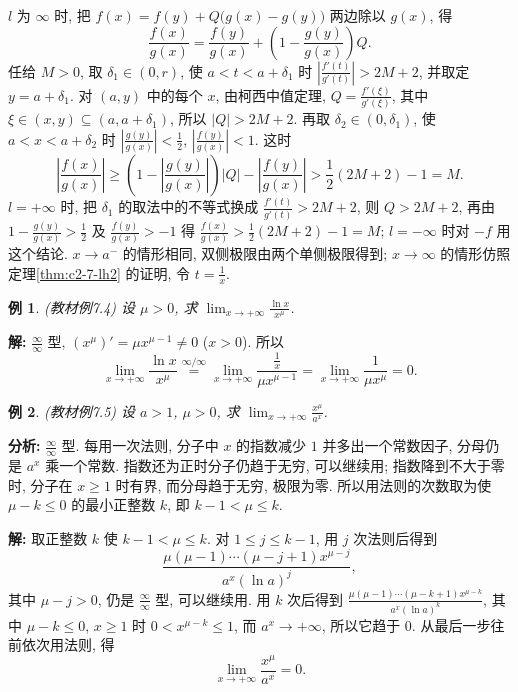 \documentclass[UTF8,openany]{ctexbook}
\theoremstyle{chinesetextbook}
\newtheorem{example}{例}[section]
\newenvironment{cnsolution}{\par\indent\textbf{解:} \ignorespaces}{\par}
\begin{document}
$l$ 为 $\infty$ 时, 把 $f(x)=f(y)+Q\bigl(g(x)-g(y)\bigr)$ 两边除以 $g(x)$, 得
\[
\frac{f(x)}{g(x)}=\frac{f(y)}{g(x)}+\left(1-\frac{g(y)}{g(x)}\right)Q.
\]
任给 $M>0$, 取 $\delta_1\in(0,r)$, 使 $a<t<a+\delta_1$ 时 $\displaystyle\left|\frac{f'(t)}{g'(t)}\right|>2M+2$, 并取定 $y=a+\delta_1$. 对 $(a,y)$ 中的每个 $x$, 由柯西中值定理, $\displaystyle Q=\frac{f'(\xi)}{g'(\xi)}$, 其中 $\xi\in(x,y)\subseteq(a,a+\delta_1)$, 所以 $|Q|>2M+2$. 再取 $\delta_2\in(0,\delta_1)$, 使 $a<x<a+\delta_2$ 时 $\displaystyle\left|\frac{g(y)}{g(x)}\right|<\frac12$, $\displaystyle\left|\frac{f(y)}{g(x)}\right|<1$. 这时
\[
\left|\frac{f(x)}{g(x)}\right|\ge\left(1-\left|\frac{g(y)}{g(x)}\right|\right)|Q|-\left|\frac{f(y)}{g(x)}\right|>\frac12(2M+2)-1=M.
\]
$l=+\infty$ 时, 把 $\delta_1$ 的取法中的不等式换成 $\displaystyle\frac{f'(t)}{g'(t)}>2M+2$, 则 $Q>2M+2$, 再由 $\displaystyle1-\frac{g(y)}{g(x)}>\frac12$ 及 $\displaystyle\frac{f(y)}{g(x)}>-1$ 得 $\displaystyle\frac{f(x)}{g(x)}>\frac12(2M+2)-1=M$; $l=-\infty$ 时对 $-f$ 用这个结论. $x\to a^-$ 的情形相同, 双侧极限由两个单侧极限得到; $x\to\infty$ 的情形仿照定理\ref{thm:c2-7-lh2} 的证明, 令 $\displaystyle t=\frac1x$.
\begin{example}\label{ex:c2-7-4}
\textnormal{(教材例7.4)} 设 $\mu>0$, 求 $\displaystyle\lim_{x\to+\infty}\frac{\ln x}{x^\mu}$.
\end{example}
\begin{cnsolution}
$\displaystyle\frac\infty\infty$ 型, $(x^\mu)'=\mu x^{\mu-1}\ne0$ ($x>0$). 所以
\[
\lim_{x\to+\infty}\frac{\ln x}{x^\mu}\overset{\infty/\infty}{=}\lim_{x\to+\infty}\frac{\frac1x}{\mu x^{\mu-1}}=\lim_{x\to+\infty}\frac1{\mu x^\mu}=0.
\]
\end{cnsolution}
\begin{example}\label{ex:c2-7-5}
\textnormal{(教材例7.5)} 设 $a>1$, $\mu>0$, 求 $\displaystyle\lim_{x\to+\infty}\frac{x^\mu}{a^x}$.
\end{example}
\par\indent\textbf{分析:} $\displaystyle\frac\infty\infty$ 型. 每用一次法则, 分子中 $x$ 的指数减少 $1$ 并多出一个常数因子, 分母仍是 $a^x$ 乘一个常数. 指数还为正时分子仍趋于无穷, 可以继续用; 指数降到不大于零时, 分子在 $x\ge1$ 时有界, 而分母趋于无穷, 极限为零. 所以用法则的次数取为使 $\mu-k\le0$ 的最小正整数 $k$, 即 $k-1<\mu\le k$.
\begin{cnsolution}
取正整数 $k$ 使 $k-1<\mu\le k$. 对 $1\le j\le k-1$, 用 $j$ 次法则后得到
\[
\frac{\mu(\mu-1)\cdots(\mu-j+1)x^{\mu-j}}{a^x(\ln a)^j},
\]
其中 $\mu-j>0$, 仍是 $\displaystyle\frac\infty\infty$ 型, 可以继续用. 用 $k$ 次后得到 $\displaystyle\frac{\mu(\mu-1)\cdots(\mu-k+1)x^{\mu-k}}{a^x(\ln a)^k}$, 其中 $\mu-k\le0$, $x\ge1$ 时 $0<x^{\mu-k}\le1$, 而 $a^x\to+\infty$, 所以它趋于 $0$. 从最后一步往前依次用法则, 得
\[
\lim_{x\to+\infty}\frac{x^\mu}{a^x}=0.
\]
\end{cnsolution}
\end{document}
